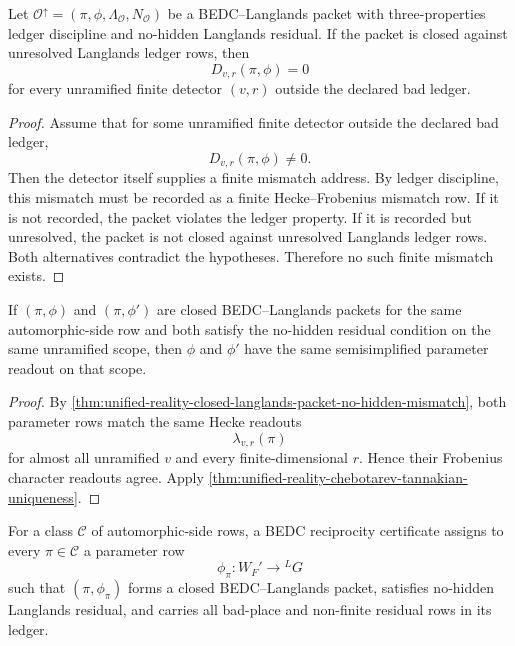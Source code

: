 \begin{theorem}
\label{thm:unified-reality-closed-langlands-packet-no-hidden-mismatch}
Let $\mathcal O^{\uparrow}=(\pi,\phi,\Lambda_{\mathcal O},N_{\mathcal O})$
be a BEDC--Langlands packet with three-properties ledger discipline and
no-hidden Langlands residual. If the packet is closed against unresolved
Langlands ledger rows, then
$$
D_{v,r}(\pi,\phi)=0
$$
for every unramified finite detector $(v,r)$ outside the declared bad
ledger.
\end{theorem}
\begin{proof}
Assume that for some unramified finite detector outside the declared bad
ledger,
$$
D_{v,r}(\pi,\phi)\ne0.
$$
Then the detector itself supplies a finite mismatch address. By ledger
discipline, this mismatch must be recorded as a finite
Hecke--Frobenius mismatch row. If it is not recorded, the packet violates
the ledger property. If it is recorded but unresolved, the packet is not
closed against unresolved Langlands ledger rows. Both alternatives
contradict the hypotheses. Therefore no such finite mismatch exists.
\end{proof}

\begin{corollary}
\label{cor:unified-reality-langlands-parameter-uniqueness}
If $(\pi,\phi)$ and $(\pi,\phi')$ are closed BEDC--Langlands packets for
the same automorphic-side row and both satisfy the no-hidden residual
condition on the same unramified scope, then $\phi$ and $\phi'$ have the
same semisimplified parameter readout on that scope.
\end{corollary}
\begin{proof}
By \autoref{thm:unified-reality-closed-langlands-packet-no-hidden-mismatch},
both parameter rows match the same Hecke readouts
$$
\lambda_{v,r}(\pi)
$$
for almost all unramified $v$ and every finite-dimensional $r$. Hence
their Frobenius character readouts agree. Apply
\autoref{thm:unified-reality-chebotarev-tannakian-uniqueness}.
\end{proof}

\begin{definition}
\label{def:unified-reality-bedc-reciprocity-certificate}
For a class $\mathcal C$ of automorphic-side rows, a BEDC reciprocity
certificate assigns to every $\pi\in\mathcal C$ a parameter row
$$
\phi_{\pi}:W_F'\to{}^LG
$$
such that $(\pi,\phi_{\pi})$ forms a closed BEDC--Langlands packet,
satisfies no-hidden Langlands residual, and carries all bad-place and
non-finite residual rows in its ledger.
\end{definition}

